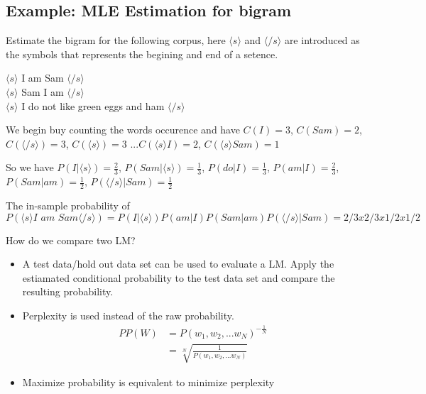 \documentclass[12pt, oneside]{article}
\begin{document}
\subsection{Example: MLE Estimation for bigram }
Estimate the bigram for the following corpus, here $\langle s \rangle$ and $\langle /s\rangle$ are introduced as the symbols that represents the begining and  end of a setence.

$\langle s \rangle$ I am Sam $\langle /s\rangle$\\
$\langle s \rangle$ Sam I am $\langle /s\rangle$\\
$\langle s \rangle$ I do not like green eggs and ham $\langle /s \rangle$

We begin buy counting the words occurence and have $C(I)=3$, $C(Sam)=2$, $C(\langle /s\rangle)=3$, $C(\langle s\rangle)=3$ ...$C(\langle s \rangle I)=2$, $C(\langle s \rangle Sam)=1$

\vspace{0.2cm}

So we have $P(I|\langle s \rangle)=\frac{2}{3}$, $P(Sam|\langle s \rangle)=\frac{1}{3}$, $P(do|I)=\frac{1}{3}$, $P(am|I)=\frac{2}{3}$, $P(Sam|am)=\frac{1}{2}$, $P(\langle /s\rangle | Sam)=\frac{1}{2}$

\vspace{0.2cm}

The in-sample probability of $P(\langle s \rangle \textit{I am Sam}\langle /s\rangle)=P(I|\langle s \rangle)P(am|I)P(Sam|am)P(\langle /s\rangle | Sam)=2/3x2/3x1/2x1/2$


How do we compare two LM?
\begin{itemize}
\item A test data/hold out data set can be used to evaluate a LM. Apply the estiamated conditional probability to the test data set and compare the resulting probability.
\item Perplexity is used instead of the raw probability. 
\begin{align*}
	PP(W)&=P(w_1, w_2, ...w_N)^{-\frac{1}{N}}\\
	&=\sqrt[N]{\frac{1}{P(w_1, w_2, ...w_N)}}
\end{align*}
\item Maximize probability is equivalent to minimize perplexity

\end{itemize}
\end{document}
